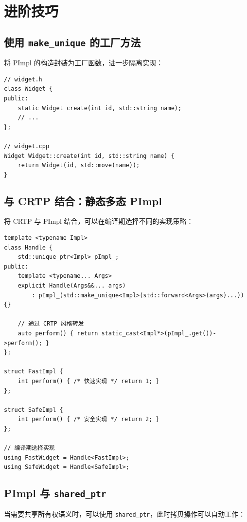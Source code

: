 \documentclass[12pt,a4paper,fontset=fandol]{ctexbook}
\begin{document}
\section{进阶技巧}

\subsection{使用 \texttt{make\_unique} 的工厂方法}

将 PImpl 的构造封装为工厂函数，进一步隔离实现：

\begin{lstlisting}[caption={工厂方法封装 PImpl}]
// widget.h
class Widget {
public:
    static Widget create(int id, std::string name);
    // ...
};

// widget.cpp
Widget Widget::create(int id, std::string name) {
    return Widget(id, std::move(name));
}
\end{lstlisting}

\subsection{与 CRTP 结合：静态多态 PImpl}

将 CRTP 与 PImpl 结合，可以在编译期选择不同的实现策略：

\begin{lstlisting}[caption={CRTP + PImpl 结合}]
template <typename Impl>
class Handle {
    std::unique_ptr<Impl> pImpl_;
public:
    template <typename... Args>
    explicit Handle(Args&&... args)
        : pImpl_(std::make_unique<Impl>(std::forward<Args>(args)...)) {}

    // 通过 CRTP 风格转发
    auto perform() { return static_cast<Impl*>(pImpl_.get())->perform(); }
};

struct FastImpl {
    int perform() { /* 快速实现 */ return 1; }
};

struct SafeImpl {
    int perform() { /* 安全实现 */ return 2; }
};

// 编译期选择实现
using FastWidget = Handle<FastImpl>;
using SafeWidget = Handle<SafeImpl>;
\end{lstlisting}

\subsection{PImpl 与 \texttt{shared\_ptr}}

当需要共享所有权语义时，可以使用 \texttt{shared\_ptr}，此时拷贝操作可以自动工作：
\end{document}
